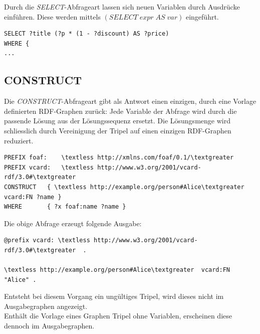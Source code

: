 Durch die \textit{SELECT}-Abfrageart lassen sich neuen Variablen durch Ausdrücke einführen. Diese werden mittels $(SELECT \; expr \; AS \; var)$ eingeführt.

\begin{lstlisting}
SELECT ?title (?p * (1 - ?discount) AS ?price)
WHERE {
...
\end{lstlisting}


\subsection{CONSTRUCT}
\label{subsec:sparql_abfragearten_construct}
Die \textit{CONSTRUCT}-Abfrageart gibt als Antwort einen einzigen, durch eine Vorlage definierten RDF-Graphen zurück: Jede Variable der Abfrage wird durch die passende Lösung aus der Lösungssequenz ersetzt. Die Lösungsmenge wird schliesslich durch Vereinigung der Tripel auf einen einzigen RDF-Graphen reduziert.

\begin{lstlisting}
PREFIX foaf:    \textless http://xmlns.com/foaf/0.1/\textgreater 
PREFIX vcard:   \textless http://www.w3.org/2001/vcard-rdf/3.0#\textgreater 
CONSTRUCT   { \textless http://example.org/person#Alice\textgreater  vcard:FN ?name }
WHERE       { ?x foaf:name ?name }
\end{lstlisting}

Die obige Abfrage erzeugt folgende Ausgabe:
\begin{lstlisting}
@prefix vcard: \textless http://www.w3.org/2001/vcard-rdf/3.0#\textgreater  .

\textless http://example.org/person#Alice\textgreater  vcard:FN "Alice" .
\end{lstlisting}

Entsteht bei diesem Vorgang ein ungültiges Tripel, wird dieses nicht im Ausgabegraphen angezeigt.\\
Enthält die Vorlage eines Graphen Tripel ohne Variablen, erscheinen diese dennoch im Ausgabegraphen.

